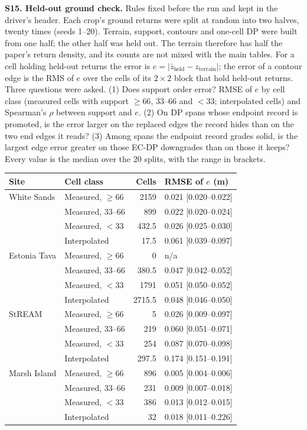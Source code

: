\documentclass[11pt]{article}
\begin{document}
\vspace{4mm}
\noindent\textbf{S15. Held-out ground check.} Rules fixed before the run and kept in the driver's header. Each crop's ground returns were split at random into two halves, twenty times (seeds 1--20). Terrain, support, contours and one-cell DP were built from one half; the other half was held out. The terrain therefore has half the paper's return density, and its counts are not mixed with the main tables. For a cell holding held-out returns the error is $e=|\bar z_{\mathrm{held}}-z_{\mathrm{terrain}}|$; the error of a contour edge is the RMS of $e$ over the cells of its $2\times2$ block that hold held-out returns. Three questions were asked. (1) Does support order error? RMSE of $e$ by cell class (measured cells with support $\geq 66$, $33$--$66$ and $<33$; interpolated cells) and Spearman's $\rho$ between support and $e$. (2) On DP spans whose endpoint record is promoted, is the error larger on the replaced edges the record hides than on the two end edges it reads? (3) Among spans the endpoint record grades solid, is the largest edge error greater on those EC-DP downgrades than on those it keeps? Every value is the median over the 20 splits, with the range in brackets.

\begin{center}\scriptsize
\begin{tabular}{@{}llrl@{}}
\toprule
Site & Cell class & Cells & RMSE of $e$ (m) \\
\midrule
White Sands & Measured, $\geq 66$ & 2159 & 0.021 [0.020--0.022] \\
 & Measured, 33--66 & 899 & 0.022 [0.020--0.024] \\
 & Measured, $<33$ & 432.5 & 0.026 [0.025--0.030] \\
 & Interpolated & 17.5 & 0.061 [0.039--0.097] \\
Estonia Tava & Measured, $\geq 66$ & 0 & n/a \\
 & Measured, 33--66 & 380.5 & 0.047 [0.042--0.052] \\
 & Measured, $<33$ & 1791 & 0.051 [0.050--0.052] \\
 & Interpolated & 2715.5 & 0.048 [0.046--0.050] \\
StREAM & Measured, $\geq 66$ & 5 & 0.026 [0.009--0.097] \\
 & Measured, 33--66 & 219 & 0.060 [0.051--0.071] \\
 & Measured, $<33$ & 254 & 0.087 [0.070--0.098] \\
 & Interpolated & 297.5 & 0.174 [0.151--0.191] \\
Marsh Island & Measured, $\geq 66$ & 896 & 0.005 [0.004--0.006] \\
 & Measured, 33--66 & 231 & 0.009 [0.007--0.018] \\
 & Measured, $<33$ & 386 & 0.013 [0.012--0.015] \\
 & Interpolated & 32 & 0.018 [0.011--0.226] \\
\bottomrule
\end{tabular}
\end{center}
\end{document}
